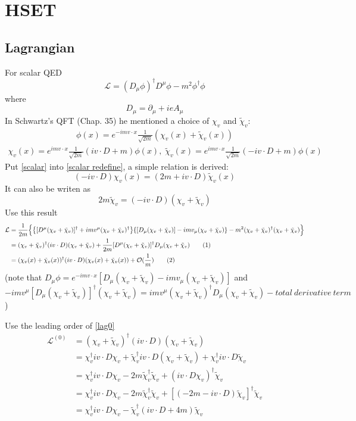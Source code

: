 \documentclass{article}
\newcommand{\lag}{\mathcal{L}}
\begin{document}
 \section{HSET}
 \subsection{Lagrangian}
For scalar QED
$$\mathcal{L}=(D_{\mu}\phi)^{\dagger}D^{\mu}\phi-m^2\phi^{\dagger}\phi$$
where
$$D_{\mu}=\partial_{\mu}+ieA_{\mu}$$
In Schwartz's QFT (Chap. 35) he mentioned a choice of $\chi_v$ and $\tilde \chi_v$:
\begin{align}
\phi(x)=e^{-imv\cdot x}\frac{1}{\sqrt{2m}}(\chi_v(x)+\tilde\chi_v(x))
\label{scalar}
\end{align}
\begin{align}
\chi_v(x)=e^{imv\cdot x}\frac{1}{\sqrt{2m}}(iv\cdot D+m)\phi(x),\;
\tilde\chi_v(x)=e^{imv\cdot x}\frac{1}{\sqrt{2m}}(-iv\cdot D+m)\phi(x)
\label{scalar redefine}
\end{align}
Put \eqref{scalar} into \eqref{scalar redefine}, a simple relation is derived:
$$(-iv\cdot D)\chi_v(x)=(2m+iv\cdot D)\tilde\chi_v(x)$$
It can also be writen as
$$2m\tilde\chi_v=(-iv\cdot D)(\chi_v+\tilde\chi_v) $$
Use this result
\begin{align*}
  \mathcal{L}&=\frac{1}{2m}\Big\{\Bqty{[D^{\mu}(\chi_v+\tilde\chi_v)]^{\dagger}+imv^{\mu}(\chi_v+\tilde\chi_v)^{\dagger}}\Bqty{[D_{\mu}(\chi_v+\tilde\chi_v)]-imv_{\mu}(\chi_v+\tilde\chi_v)}-m^2(\chi_v+\tilde\chi_v)^{\dagger}(\chi_v+\tilde\chi_v)\Big\}\\
  &=(\chi_v+\tilde\chi_v)^{\dagger}(iv\cdot D)(\chi_v+\tilde\chi_v)+\frac{1}{2m}[D^{\mu}(\chi_v+\tilde\chi_v)]^{\dagger}D_{\mu}(\chi_v+\tilde\chi_v)
  \stepcounter{equation}\tag{\theequation}\label{lag0}\\
&=(\chi_v(x)+\tilde\chi_v(x))^{\dagger}(iv\cdot D)(\chi_v(x)+\tilde\chi_v(x))+\mathcal{O}(\frac{1}{m}) \stepcounter{equation}\tag{\theequation}\label{lag1}
\end{align*}
(note that $D_{\mu}\phi=e^{-imv\cdot x}[D_{\mu}(\chi_v+\tilde \chi_v)-imv_{\mu}(\chi_v+\tilde\chi_v)]$ and $-imv^{\mu}[D_{\mu}(\chi_v+\tilde \chi_v)]^{\dagger}(\chi_v+\tilde \chi_v)=imv^{\mu}(\chi_v+\tilde\chi_v)^{\dagger}D_{\mu}(\chi_v+\tilde \chi_v)-total\ derivative\ term$)

Use the leading order of \eqref{lag0}
\begin{align*}
  \lag^{(0)}&=(\chi_v+\tilde\chi_v)^{\dagger}(iv\cdot D)(\chi_v+\tilde\chi_v)\\
  &=\chi_v^{\dagger}iv\cdot D\chi_v+\tilde\chi_v^{\dagger}iv\cdot D(\chi_v+\tilde\chi_v)+\chi_v^{\dagger}iv\cdot D\tilde\chi_v\\
  &=\chi_v^{\dagger}iv\cdot D\chi_v-2m\tilde\chi_v^{\dagger}\tilde\chi_v+(iv\cdot D\chi_v)^{\dagger}\tilde\chi_v\\
&=\chi_v^{\dagger}iv\cdot D\chi_v-2m\tilde\chi_v^{\dagger}\tilde\chi_v+[(-2m-iv\cdot D)\tilde\chi_v]^{\dagger}\tilde\chi_v\\
&=\chi_v^{\dagger}iv\cdot D\chi_v-\tilde\chi_v^{\dagger}(iv\cdot D+4m)\tilde\chi_v
\end{align*}
\end{document}
